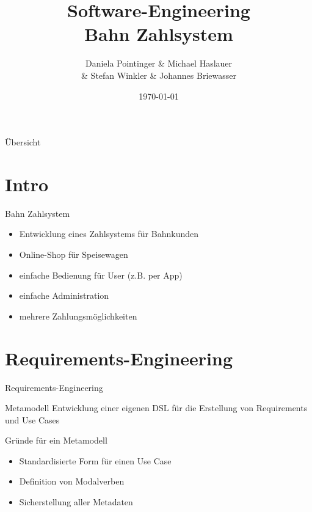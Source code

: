 \documentclass{beamer}
\title[]{Software-Engineering\\Bahn Zahlsystem}
\author{Daniela Pointinger \& Michael Haslauer \\\& Stefan Winkler \& Johannes Briewasser}
\institute{FH-Salzburg, Studiengang ITSB-M}
\date{\today}
\begin{document}
\begin{frame}
	\titlepage
\end{frame}

\begin{frame}{Übersicht}
	\tableofcontents
\end{frame}

\section{Intro}
\begin{frame}{Bahn Zahlsystem}
	\begin{itemize}
		\item Entwicklung eines Zahlsystems für Bahnkunden
		\item Online-Shop für Speisewagen
		\item einfache Bedienung für User (z.B. per App)
		\item einfache Administration
		\item mehrere Zahlungsmöglichkeiten
	\end{itemize}
\end{frame}

\section{Requirements-Engineering}
\begin{frame}{Requirements-Engineering}
	\begin{block}{Metamodell}
		Entwicklung einer eigenen DSL für die Erstellung von Requirements und Use Cases
	\end{block}
	
	\begin{block}{Gründe für ein Metamodell}
	\begin{itemize}
		\item Standardisierte Form für einen Use Case
		\item Definition von Modalverben
		\item Sicherstellung aller Metadaten
	\end{itemize}
	\end{block}
\end{frame}
\end{document}
